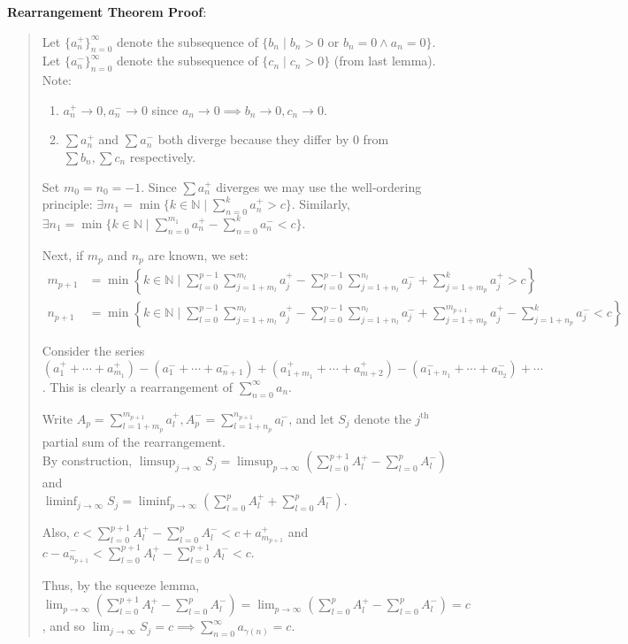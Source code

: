 \documentclass[11pt]{article}
\begin{document}
\textbf{Rearrangement Theorem Proof}:
\begin{quote}\vspace{-0.3cm}
Let $\{a_n^+\}_{n=0}^\infty$ denote the subsequence of $\{b_n \;|\; b_n > 0$ or $b_n = 0 \land a_n = 0\}$. Let $\{a_n^-\}_{n=0}^\infty$ denote the subsequence of $\{c_n \;|\; c_n > 0\}$ (from last lemma). Note:

\begin{enumerate}
\item $a_n^+ \to 0, a_n^- \to 0$ since $a_n \to 0 \implies b_n \to 0, c_n \to 0$.
\item $\sum a_n^+$ and $\sum a_n^-$ both diverge because they differ by 0 from $\sum b_n, \sum c_n$ respectively.
\end{enumerate}
Set $m_0 = n_0 = -1$. Since $\sum a_n^+$ diverges we may use the well-ordering principle: $\exists m_1 = \min\{k \in \mathbb{N} \;|\; \sum_{n=0}^k a_n^+ > c\}$. Similarly, $\exists n_1 = \min\{k \in \mathbb{N} \;|\; \sum_{n=0}^{m_1} a_n^+ - \sum_{n=0}^k a_n^- < c\}$.

Next, if $m_p$ and $n_p$ are known, we set:
\begin{align*}
m_{p+1} &= \min\left\{k \in \mathbb{N} \;|\; \sum_{l=0}^{p-1} \sum_{j=1+m_l}^{m_l} a_j^+ - \sum_{l=0}^{p-1} \sum_{j=1+n_l}^{n_l} a_j^- + \sum_{j=1+m_p}^k a_j^+ > c\right\}\\
n_{p+1} &= \min\left\{k \in \mathbb{N} \;|\; \sum_{l=0}^{p-1} \sum_{j=1+m_l}^{m_l} a_j^+ - \sum_{l=0}^{p-1} \sum_{j=1+n_l}^{n_l} a_j^- + \sum_{j=1+m_p}^{m_{p+1}} a_j^+ - \sum_{j=1+n_p}^k a_j^- < c\right\}
\end{align*}

Consider the series $(a_1^+ + \cdots + a_{m_1}^+) - (a_1^- + \cdots + a_{n+1}^-) + (a_{1+m_1}^+ + \cdots + a_{m+2}^+) - (a_{1+n_1}^- + \cdots + a_{n_2}^-) + \cdots$. This is clearly a rearrangement of $\sum_{n=0}^\infty a_n$.

Write $A_p = \sum_{l=1+m_p}^{m_{p+1}} a_l^+, A_p^- = \sum_{l=1+n_p}^{n_{p+1}} a_l^-$, and let $S_j$ denote the $j^\text{th}$ partial sum of the rearrangement.\\
By construction, $\limsup_{j \to \infty} S_j = \limsup_{p \to \infty} (\sum_{l=0}^{p+1} A_l^+ - \sum_{l=0}^p A_l^-)$ and\\
$\liminf_{j \to \infty} S_j = \liminf_{p \to \infty} (\sum_{l=0}^p A_l^+ + \sum_{l=0}^p A_l^-)$.

Also, $c < \sum_{l=0}^{p+1} A_l^+ - \sum_{l=0}^p A_l^- < c + a_{m_{p+1}}^+$ and $c - a_{n_{p+1}}^- < \sum_{l=0}^{p+1} A_l^+ - \sum_{l=0}^{p+1} A_l^- < c$.

Thus, by the squeeze lemma, $\lim_{p \to \infty} (\sum_{l=0}^{p+1} A_l^+ - \sum_{l=0}^p A_l^-) = \lim_{p \to \infty} (\sum_{l=0}^p A_l^+ - \sum_{l=0}^p A_l^-) = c$, and so $\lim_{j \to \infty} S_j = c \implies \sum_{n=0}^\infty a_{\gamma(n)} = c$.
\end{quote}
\end{document}
